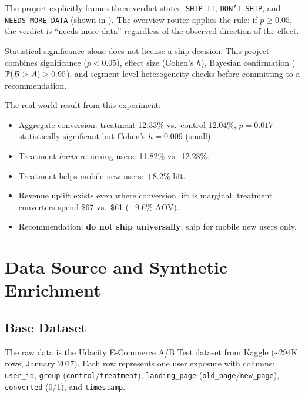The project explicitly frames three verdict states: \texttt{SHIP IT},
\texttt{DON'T SHIP}, and \texttt{NEEDS MORE DATA} (shown in
). The overview router applies the rule: if
$p \geq 0.05$, the verdict is ``needs more data'' regardless of the observed
direction of the effect.

\begin{keyinsight}
  Statistical significance alone does not license a ship decision. This project
  combines significance ($p < 0.05$), effect size (Cohen's $h$), Bayesian
  confirmation ($\operatorname{\mathbb{P}}(B > A) > 0.95$), and segment-level heterogeneity checks
  before committing to a recommendation.
\end{keyinsight}

The real-world result from this experiment:
\begin{itemize}
  \item Aggregate conversion: treatment 12.33\% vs.\ control 12.04\%,
    $p = 0.017$ -- statistically significant but Cohen's $h = 0.009$ (small).
  \item Treatment \emph{hurts} returning users: 11.82\% vs.\ 12.28\%.
  \item Treatment helps mobile new users: $+8.2\%$ lift.
  \item Revenue uplift exists even where conversion lift is marginal:
    treatment converters spend \$67 vs.\ \$61 ($+9.6\%$ AOV).
  \item Recommendation: \textbf{do not ship universally}; ship for mobile new
    users only.
\end{itemize}

\section{Data Source and Synthetic Enrichment}
\label{sec:abtest-data}


\subsection{Base Dataset}

The raw data is the Udacity E-Commerce A/B Test dataset from Kaggle
(\textasciitilde294K rows, January 2017). Each row represents one user
exposure with columns: \texttt{user\_id}, \texttt{group}
(\texttt{control}/\texttt{treatment}), \texttt{landing\_page}
(\texttt{old\_page}/\texttt{new\_page}), \texttt{converted} (0/1), and
\texttt{timestamp}.

